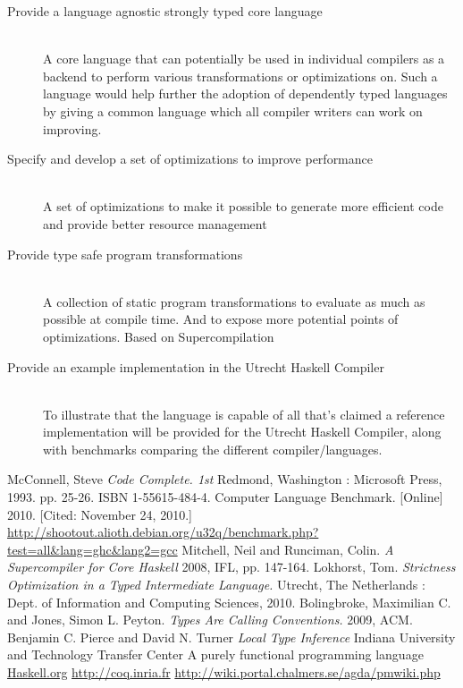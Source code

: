\documentclass[11pt,twoside,a4paper]{article}
\begin{document}
\begin{description}
 \item[Provide a language agnostic strongly typed core language] \hfill \\
 A core language that can potentially be used in individual compilers as a backend to perform various transformations or optimizations on. Such a language would help further the adoption of dependently typed languages by giving a common language which all compiler writers can work on improving. \cite{Tom}
 \item[Specify and develop a set of optimizations to improve performance] \hfill \\
A set of optimizations to make it possible to generate more efficient code and provide better resource management \cite{types}
 \item[Provide type safe program transformations] \hfill \\
A collection of static program transformations to evaluate as much as possible at compile time. And to expose more potential points of optimizations. Based on Supercompilation \cite{super}
 \item[Provide an example implementation in the Utrecht Haskell Compiler] \hfill  \\
To illustrate that the language is capable of all that's claimed a reference implementation will be provided for the Utrecht Haskell Compiler, along with benchmarks comparing the different compiler/languages.
 \end{description}
\begin{thebibliography}{9}
  McConnell, Steve
  \emph{ Code Complete. 1st}
  Redmond, Washington : Microsoft Press, 1993. pp. 25-26. ISBN 1-55615-484-4.
  Computer Language Benchmark. [Online] 2010. [Cited: November 24, 2010.] \url{http://shootout.alioth.debian.org/u32q/benchmark.php?test=all&lang=ghc&lang2=gcc}
  Mitchell, Neil and Runciman, Colin.
  \emph{A Supercompiler for Core Haskell}
  2008, IFL, pp. 147-164.
  Lokhorst, Tom. 
  \emph{Strictness Optimization in a Typed Intermediate Language.}
   Utrecht, The Netherlands : Dept. of Information and Computing Sciences, 2010.
  Bolingbroke, Maximilian C. and Jones, Simon L. Peyton.
  \emph{Types Are Calling Conventions.} 
  2009, ACM.
  Benjamin C. Pierce and David N. Turner
  \emph{Local Type Inference}
  Indiana University and Technology Transfer Center
	A purely functional programming language \url{Haskell.org}
	\url{http://coq.inria.fr}
	\url{http://wiki.portal.chalmers.se/agda/pmwiki.php}
\end{thebibliography}
\end{document}
